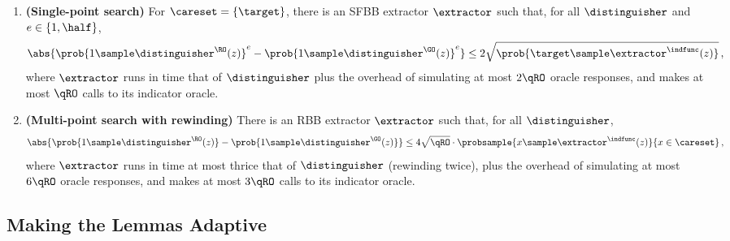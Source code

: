 \begin{lemma}
\begin{enumerate}
          that, for all $\distinguisher$ and $e \in \{1, \half\}$,
          \[
            \abs{
              \prob{1 \sample \distinguisher^{\RO}(z)}^e - \prob{1 \sample \distinguisher^{\GO}(z)}^e
            } \leq 2 \sqrt{
              (\qRO + 1) \cdot \probsample{x \sample \extractor^{\indfunc}(z)}{x \in \careset}
            }\, ,
          \]
          where $\extractor$ runs in time that of $\distinguisher$ plus the
          overhead of simulating at most $\qRO$ oracle responses,
          and makes at most $\qRO$ calls to its indicator oracle.
        \item \textbf{(Single-point search)} For $\careset = \{\target\}$, there is an SFBB extractor $\extractor$ such
          that, for all $\distinguisher$ and $e \in \{1, \half\}$,
          \[
            \abs{
              \prob{1 \sample \distinguisher^{\RO}(z)}^e - \prob{1 \sample \distinguisher^{\GO}(z)}^e
            } \leq 2 \sqrt{
              \prob{\target \sample \extractor^{\indfunc}(z)}
            }\, ,
          \]
          where $\extractor$ runs in time that of $\distinguisher$ plus the
          overhead of simulating at most $2\qRO$ oracle responses,
          and makes at most $\qRO$ calls to its indicator oracle.
        \item \textbf{(Multi-point search with rewinding)} There is an RBB
          extractor $\extractor$ such that, for all $\distinguisher$,
          \[
            \abs{
              \prob{1 \sample \distinguisher^{\RO}(z)} - \prob{1 \sample \distinguisher^{\GO}(z)}
            } \leq 4 \sqrt{\qRO} \cdot \probsample{x \sample \extractor^{\indfunc}(z)}{x \in \careset}\, ,
          \]
          where $\extractor$ runs in time at most thrice that of $\distinguisher$ (rewinding
          twice), plus the overhead of simulating at most $6\qRO$ oracle
          responses, and makes at most $3\qRO$ calls to its indicator oracle.
      \end{enumerate}
    \end{lemma}

  \ifdraftversion
    \subsection{Making the Lemmas Adaptive}
  \fi




